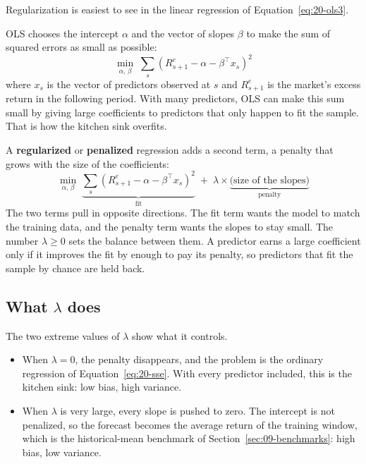 Regularization is easiest to see in the linear regression of Equation~\eqref{eq:20-ols3}.

OLS chooses the intercept $\alpha$ and the vector of slopes $\beta$ to make the sum of squared errors as small as possible:
\begin{equation}
  \min_{\alpha,\,\beta} \; \sum_{s} \left(R^{e}_{s+1} - \alpha - \beta^{\top} x_s\right)^2
  \label{eq:20-sse}
\end{equation}
where $x_s$ is the vector of predictors observed at $s$ and $R^{e}_{s+1}$ is the market's excess return in the following period. With many predictors, OLS can make this sum small by giving large coefficients to predictors that only happen to fit the sample. That is how the kitchen sink overfits.

A \textbf{regularized} or \textbf{penalized} regression adds a second term, a penalty that grows with the size of the coefficients:
\begin{equation}
  \min_{\alpha,\,\beta} \; \underbrace{\sum_{s} \left(R^{e}_{s+1} - \alpha - \beta^{\top} x_s\right)^2}_{\text{fit}}
  \; + \; \lambda \times \underbrace{\text{(size of the slopes)}}_{\text{penalty}}
  \label{eq:20-penalty}
\end{equation}
The two terms pull in opposite directions. The fit term wants the model to match the training data, and the penalty term wants the slopes to stay small. The number $\lambda \ge 0$ sets the balance between them. A predictor earns a large coefficient only if it improves the fit by enough to pay its penalty, so predictors that fit the sample by chance are held back.

\subsection{What \texorpdfstring{$\lambda$}{lambda} does}

The two extreme values of $\lambda$ show what it controls.

\begin{itemize}
  \item When $\lambda = 0$, the penalty disappears, and the problem is the ordinary regression of Equation~\eqref{eq:20-sse}. With every predictor included, this is the kitchen sink: low bias, high variance.
  \item When $\lambda$ is very large, every slope is pushed to zero. The intercept is not penalized, so the forecast becomes the average return of the training window, which is the historical-mean benchmark of Section~\ref{sec:09-benchmarks}: high bias, low variance.
\end{itemize}

